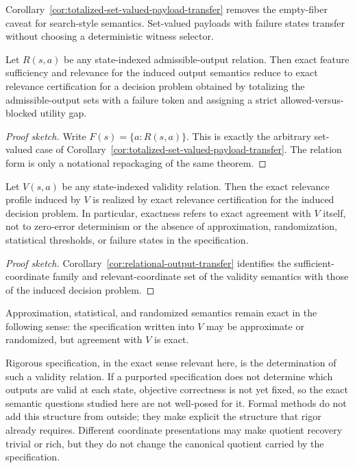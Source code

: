 Corollary~\ref{cor:totalized-set-valued-payload-transfer} removes the empty-fiber caveat for search-style semantics. Set-valued payloads with failure states transfer without choosing a deterministic witness selector.

\begin{corollary}\label{cor:relational-output-transfer}
Let $R(s,a)$ be any state-indexed admissible-output relation. Then exact feature sufficiency and relevance for the induced output semantics reduce to exact relevance certification for a decision problem obtained by totalizing the admissible-output sets with a failure token and assigning a strict allowed-versus-blocked utility gap.
\end{corollary}

\begin{proof}[Proof sketch]
Write $F(s)=\{a : R(s,a)\}$. This is exactly the arbitrary set-valued case of Corollary~\ref{cor:totalized-set-valued-payload-transfer}. The relation form is only a notational repackaging of the same theorem.
\end{proof}

\begin{proposition}\label{prop:exactness-means-exact-agreement-with-validity}
Let $V(s,a)$ be any state-indexed validity relation. Then the exact relevance profile induced by $V$ is realized by exact relevance certification for the induced decision problem. In particular, exactness refers to exact agreement with $V$ itself, not to zero-error determinism or the absence of approximation, randomization, statistical thresholds, or failure states in the specification.
\end{proposition}

\begin{proof}[Proof sketch]
Corollary~\ref{cor:relational-output-transfer} identifies the sufficient-coordinate family and relevant-coordinate set of the validity semantics with those of the induced decision problem.
\end{proof}

Approximation, statistical, and randomized semantics remain exact in the following sense: the specification written into $V$ may be approximate or randomized, but agreement with $V$ is exact.

Rigorous specification, in the exact sense relevant here, is the determination of such a validity relation. If a purported specification does not determine which outputs are valid at each state, objective correctness is not yet fixed, so the exact semantic questions studied here are not well-posed for it. Formal methods do not add this structure from outside; they make explicit the structure that rigor already requires. Different coordinate presentations may make quotient recovery trivial or rich, but they do not change the canonical quotient carried by the specification.

